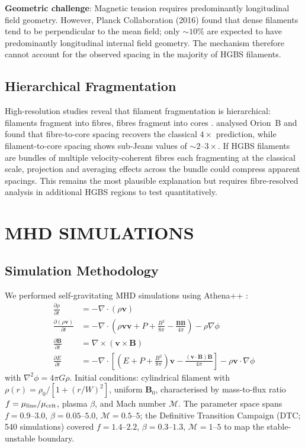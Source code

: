 \documentclass[twoside,twocolumn]{mnras}
\begin{document}
\textbf{Geometric challenge}: Magnetic tension requires predominantly longitudinal field
geometry. However, Planck Collaboration (2016) found that dense filaments tend to be
perpendicular to the mean field; only ${\sim}10\%$ are expected to have predominantly
longitudinal internal field geometry. The mechanism therefore cannot account for the
observed spacing in the majority of HGBS filaments.

\subsection{Hierarchical Fragmentation}

High-resolution studies reveal that filament fragmentation is hierarchical: filaments
fragment into fibres, fibres fragment into cores \citep{Hacar2013, Hacar2018}.
\citet{Yang2024} analysed Orion~B and found that fibre-to-core spacing recovers the
classical $4\times$ prediction, while filament-to-core spacing shows sub-Jeans values
of ${\sim}2$--$3\times$. If HGBS filaments are bundles of multiple velocity-coherent
fibres each fragmenting at the classical scale, projection and averaging effects across
the bundle could compress apparent spacings. This remains the most plausible explanation
but requires fibre-resolved analysis in additional HGBS regions to test quantitatively.

\section{MHD SIMULATIONS}

\subsection{Simulation Methodology}

We performed self-gravitating MHD simulations using Athena++ \citep{Stone2020}:
\begin{align}
\frac{\partial \rho}{\partial t} &= -\nabla \cdot (\rho \mathbf{v}) \\
\frac{\partial (\rho \mathbf{v})}{\partial t} &= -\nabla \cdot \left(\rho \mathbf{v} \mathbf{v} + P + \frac{B^2}{8\pi} - \frac{\mathbf{B}\mathbf{B}}{4\pi}\right) - \rho \nabla \phi \\
\frac{\partial \mathbf{B}}{\partial t} &= \nabla \times (\mathbf{v} \times \mathbf{B}) \\
\frac{\partial E}{\partial t} &= -\nabla \cdot \left[\left(E + P + \frac{B^2}{8\pi}\right)\mathbf{v} - \frac{(\mathbf{v} \cdot \mathbf{B})\mathbf{B}}{4\pi}\right] - \rho \mathbf{v} \cdot \nabla \phi
\end{align}
with $\nabla^2 \phi = 4\pi G\rho$. Initial conditions: cylindrical filament with
$\rho(r) = \rho_0 / [1 + (r/W)^2]$, uniform $\mathbf{B}_0$, characterised by
mass-to-flux ratio $f = \mu_{\rm line}/\mu_{\rm crit}$, plasma $\beta$, and
Mach number $\mathcal{M}$. The parameter space spans $f = 0.9$--$3.0$,
$\beta = 0.05$--$5.0$, $\mathcal{M} = 0.5$--$5$; the Definitive Transition Campaign
(DTC; 540 simulations) covered $f = 1.4$--$2.2$, $\beta = 0.3$--$1.3$,
$\mathcal{M} = 1$--$5$ to map the stable-unstable boundary.
\end{document}
